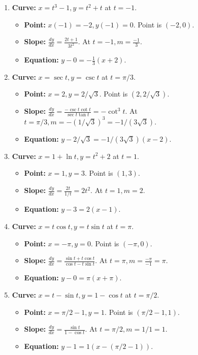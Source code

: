 \documentclass[12pt]{article}
\begin{document}
\begin{enumerate}
    \item \textbf{Curve:} $x=t^3-1, y=t^2+t$ at $t=-1$.
    \begin{itemize}
        \item \textbf{Point:} $x(-1)=-2, y(-1)=0$. Point is $(-2,0)$.
        \item \textbf{Slope:} $\frac{dy}{dx}=\frac{2t+1}{3t^2}$. At $t=-1, m=\frac{-1}{3}$.
        \item \textbf{Equation:} $y-0 = -\frac{1}{3}(x+2)$.
    \end{itemize}

    \item \textbf{Curve:} $x=\sec t, y=\csc t$ at $t=\pi/3$.
    \begin{itemize}
        \item \textbf{Point:} $x=2, y=2/\sqrt{3}$. Point is $(2, 2/\sqrt{3})$.
        \item \textbf{Slope:} $\frac{dy}{dx}=\frac{-\csc t \cot t}{\sec t \tan t}=-\cot^3 t$. At $t=\pi/3, m=-(1/\sqrt{3})^3 = -1/(3\sqrt{3})$.
        \item \textbf{Equation:} $y-2/\sqrt{3} = -1/(3\sqrt{3})(x-2)$.
    \end{itemize}
    
    \item \textbf{Curve:} $x=1+\ln t, y=t^2+2$ at $t=1$.
    \begin{itemize}
        \item \textbf{Point:} $x=1, y=3$. Point is $(1,3)$.
        \item \textbf{Slope:} $\frac{dy}{dx}=\frac{2t}{1/t}=2t^2$. At $t=1, m=2$.
        \item \textbf{Equation:} $y-3=2(x-1)$.
    \end{itemize}
    
    \item \textbf{Curve:} $x=t\cos t, y=t\sin t$ at $t=\pi$.
    \begin{itemize}
        \item \textbf{Point:} $x=-\pi, y=0$. Point is $(-\pi,0)$.
        \item \textbf{Slope:} $\frac{dy}{dx}=\frac{\sin t+t\cos t}{\cos t-t\sin t}$. At $t=\pi, m=\frac{-\pi}{-1}=\pi$.
        \item \textbf{Equation:} $y-0=\pi(x+\pi)$.
    \end{itemize}

    \item \textbf{Curve:} $x=t-\sin t, y=1-\cos t$ at $t=\pi/2$.
    \begin{itemize}
        \item \textbf{Point:} $x=\pi/2-1, y=1$. Point is $(\pi/2-1, 1)$.
        \item \textbf{Slope:} $\frac{dy}{dx}=\frac{\sin t}{1-\cos t}$. At $t=\pi/2, m=1/1=1$.
        \item \textbf{Equation:} $y-1 = 1(x-(\pi/2-1))$.
    \end{itemize}
    

\end{enumerate}
\end{document}
